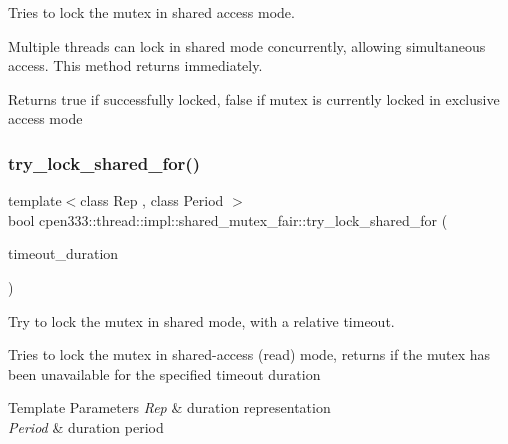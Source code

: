 Tries to lock the mutex in shared access mode. 

Multiple threads can lock in shared mode concurrently, allowing simultaneous access. This method returns immediately.

\begin{DoxyReturn}{Returns}
true if successfully locked, false if mutex is currently locked in exclusive access mode 
\end{DoxyReturn}
\mbox{\label{classcpen333_1_1thread_1_1impl_1_1shared__mutex__fair_a3cc8d50bd79ee83b370f717674eb3093}} 
\subsubsection{\texorpdfstring{try\+\_\+lock\+\_\+shared\+\_\+for()}{try\_lock\_shared\_for()}}
{\footnotesize\ttfamily template$<$class Rep , class Period $>$ \\
bool cpen333\+::thread\+::impl\+::shared\+\_\+mutex\+\_\+fair\+::try\+\_\+lock\+\_\+shared\+\_\+for (\begin{DoxyParamCaption}\item[{const std\+::chrono\+::duration$<$ Rep, Period $>$ \&}]{timeout\+\_\+duration }\end{DoxyParamCaption})\hspace{0.3cm}{\ttfamily [inline]}}



Try to lock the mutex in shared mode, with a relative timeout. 

Tries to lock the mutex in shared-\/access (read) mode, returns if the mutex has been unavailable for the specified timeout duration


\begin{DoxyTemplParams}{Template Parameters}
{\em Rep} & duration representation \\
\hline
{\em Period} & duration period \\
\hline
\end{DoxyTemplParams}

